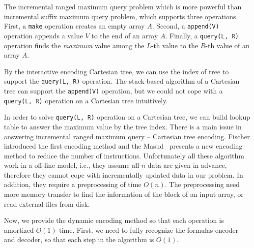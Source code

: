 
The incremental ranged maximum query problem which is more powerful than
incremental suffix maximum query problem, which supports three
operations.  First, a {\tt make} operation creates an empty array $A$.
Second, a {\tt append(V) } operation appends a value $V$ to the end of
an array $A$.  Finally, a {\tt query(L, R)} operation finds the {\em
maximum} value among the $L$-th value to the $R$-th value of an array
$A$.  


By the interactive encoding Cartesian tree, we can use the index of tree
to support the {\tt query(L, R)} operation.  The stack-based algorithm
of a Cartesian tree can support the {\tt append(V)} operation, but we
could not cope with a {\tt query(L, R)} operation on a Cartesian tree
intuitively.


In order to solve {\tt query(L, R)} operation on a Cartesian tree, we
can build lookup table to answer the maximum value by the tree index.
There is a main issue in answering incremental ranged maximum query --
Cartesian tree encoding.  Fischer introduced the first encoding method
and the Masud~\cite{Hasan2010CacheOA} presents a new encoding method to
reduce the number of instructions.  Unfortunately all these algorithm
work in a off-line model, i.e., they assume all $n$ data are given in
advance, therefore they cannot cope with incrementally updated data in
our problem.  In addition, they require a preprocessing of time $O(n)$.
The preprocessing need more memory transfer to find the information of
the block of an input array, or read external files from disk.


Now, we provide the dynamic encoding method so that each operation is
amortized $O(1)$ time.  First, we need to fully recognize the formulas
encoder and decoder, so that each step in the algorithm is $O(1)$.


\iffalse

接下來的幾段中，我們提供動態的編碼方式使得每一操作皆均攤 $O(1)$
完成。首先，我們需要充分認知編碼相互轉換的公式，藉以在算法中完成每一步
皆為 $O(1)$ 的要求。

在上一節提出對於任意編號 $\mathit{tid}$ 可以在 $O(n)$ 時間內得到
$\langle\mathit{lsz},\mathit{lid},\mathit{rsz},\mathit{rid}\rangle$；
相反地，可以在 $\theta(1)$ 時間內逆推得到 $\mathit{tid}$，如算法
~\ref{alg:encode-tid}。透過預處理，事先將所有前綴和保存下來，在算法中
的迴圈可視為一次內存存取，使得時間複雜度 $\theta(1)$。\fi




